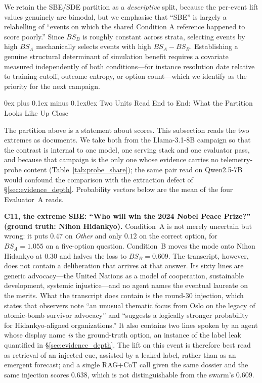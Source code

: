 \documentclass[11pt,journal,onecolumn]{IEEEtran}
\makeatletter
\renewcommand\subsubsection{\@startsection{subsubsection}{3}{\parindent}%
  {0ex plus 0.1ex minus 0.1ex}{0ex}%
  {\normalfont\normalsize\bfseries\itshape}}
\makeatother
\begin{document}
We retain the SBE/SDE partition as a \emph{descriptive} split, because the per-event lift values genuinely are bimodal, but we emphasise that ``SBE'' is largely a relabelling of ``events on which the shared Condition A reference happened to score poorly.'' Since $BS_B$ is roughly constant across strata, selecting events by high $BS_A$ mechanically selects events with high $BS_A - BS_B$. Establishing a genuine structural determinant of simulation benefit requires a covariate measured independently of both conditions---for instance resolution date relative to training cutoff, outcome entropy, or option count---which we identify as the priority for the next campaign.

\subsubsection{Two Units Read End to End: What the Partition Looks Like Up Close}
\label{sec:case_studies}

The partition above is a statement about scores. This subsection reads the two extremes as documents. We take both from the Llama-3.1-8B campaign so that the contrast is internal to one model, one serving stack and one evaluator pass, and because that campaign is the only one whose evidence carries no telemetry-probe content (Table~\ref{tab:probe_share}); the same pair read on Qwen2.5-7B would confound the comparison with the extraction defect of \S\ref{sec:evidence_depth}. Probability vectors below are the mean of the four Evaluator~A reads.

\textbf{C11, the extreme SBE: ``Who will win the 2024 Nobel Peace Prize?'' (ground truth: Nihon Hidankyo).} Condition~A is not merely uncertain but wrong: it puts $0.47$ on \emph{Other} and only $0.12$ on the correct option, for $BS_A = 1.055$ on a five-option question. Condition~B moves the mode onto Nihon Hidankyo at $0.30$ and halves the loss to $BS_B = 0.609$. The transcript, however, does not contain a deliberation that arrives at that answer. Its sixty lines are generic advocacy---the United Nations as a model of cooperation, sustainable development, systemic injustice---and no agent names the eventual laureate on the merits. What the transcript does contain is the round-30 injection, which states that observers note ``an unusual thematic focus from Oslo on the legacy of atomic-bomb survivor advocacy'' and ``suggests a logically stronger probability for Hidankyo-aligned organizations.'' It also contains two lines spoken by an agent whose display name \emph{is} the ground-truth option, an instance of the label leak quantified in \S\ref{sec:evidence_depth}. The lift on this event is therefore best read as retrieval of an injected cue, assisted by a leaked label, rather than as an emergent forecast; and a single RAG+CoT call given the same dossier and the same injection scores $0.638$, which is not distinguishable from the swarm's $0.609$.
\end{document}
